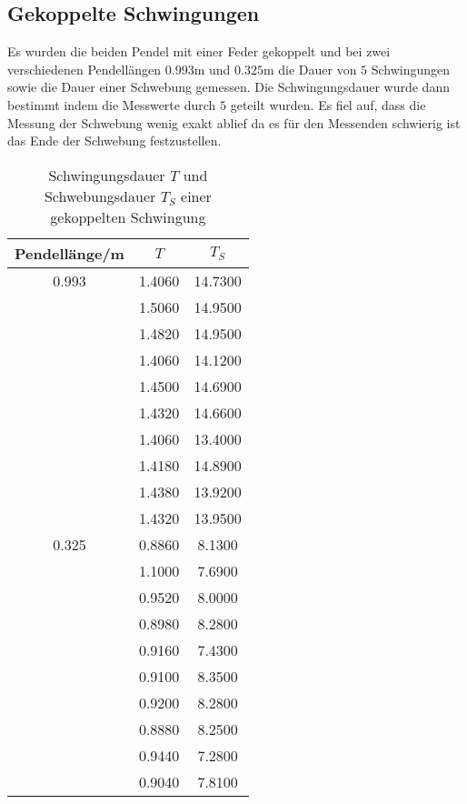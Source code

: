   \subsection{Gekoppelte Schwingungen}
    Es wurden die beiden Pendel mit einer Feder gekoppelt und bei zwei verschiedenen Pendellängen $0.993$m und $0.325$m die Dauer
    von $5$ Schwingungen sowie die Dauer einer Schwebung gemessen. Die Schwingungsdauer wurde dann bestimmt indem die Messwerte
    durch $5$ geteilt wurden. Es fiel auf, dass die Messung der Schwebung wenig exakt ablief da es für den Messenden schwierig
    ist das Ende der Schwebung festzustellen.
    \begin{table}
      \centering
        \caption{Schwingungsdauer $T$ und Schwebungsdauer $T_{S}$ einer gekoppelten Schwingung}
        \label{tab:aufgabe4}
        \begin{tabular}{S S S}
          \toprule
          {Pendellänge/m} & {$T$} & {$T_{S}$} \\
             &   1.4060 &     14.7300 \\
                  &   1.5060 &     14.9500 \\
                  &   1.4820 &     14.9500 \\
                  &   1.4060 &     14.1200 \\
                  &   1.4500 &     14.6900 \\
                  &   1.4320 &     14.6600 \\
                  &   1.4060 &     13.4000 \\
                  &   1.4180 &     14.8900 \\
                  &   1.4380 &     13.9200 \\
                  &   1.4320 &     13.9500 \\
          0.325   &   0.8860 &     8.1300 \\
                  &   1.1000 &     7.6900 \\
                  &   0.9520 &     8.0000 \\
                  &   0.8980 &     8.2800 \\
                  &   0.9160 &     7.4300 \\
                  &   0.9100 &     8.3500 \\
                  &   0.9200 &     8.2800 \\
                  &   0.8880 &     8.2500 \\
                  &   0.9440 &     7.2800 \\
                  &   0.9040 &     7.8100 \\
          \bottomrule
        \end{tabular}
      \end{table}
    \newpage
